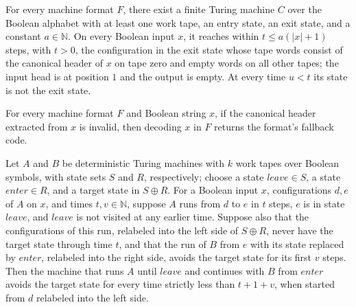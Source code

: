 \begin{lemma}
\label{Turing.MachineFormat.exists_canonHeaderBranch}
\leanok
{}
For every machine format $F$, there exist a finite Turing machine $C$ over the Boolean
alphabet with at least one work tape, an entry state, an exit state, and a constant
$a\in\mathbb N$. On every Boolean input $x$, it reaches within $t\le a(|x|+1)$ steps,
with $t>0$, the configuration in the exit state whose tape words consist of the
canonical header of $x$ on tape zero and empty words on all other tapes; the input head
is at position $1$ and the output is empty. At every time $u<t$ its state is not the
exit state.
\end{lemma}

\begin{lemma}
\label{Turing.MachineFormat.decode_of_canonHeader}
\leanok
{}
For every machine format $F$ and Boolean string $x$, if the canonical header extracted
from $x$ is invalid, then decoding $x$ in $F$ returns the format’s fallback code.
\end{lemma}

\begin{lemma}
\label{Turing.MachineFormat.canonSeam_avoids}
\leanok
{}
Let $A$ and $B$ be deterministic Turing machines with $k$ work tapes over Boolean
symbols, with state sets $S$ and $R$, respectively; choose a state $leave\in S$, a state
$enter\in R$, and a target state in $S\oplus R$. For a Boolean input $x$, configurations
$d,e$ of $A$ on $x$, and times $t,v\in\mathbb N$, suppose $A$ runs from $d$ to $e$ in
$t$ steps, $e$ is in state $leave$, and $leave$ is not visited at any earlier time.
Suppose also that the configurations of this run, relabeled into the left side of
$S\oplus R$, never have the target state through time $t$, and that the run of $B$ from
$e$ with its state replaced by $enter$, relabeled into the right side, avoids the target
state for its first $v$ steps. Then the machine that runs $A$ until $leave$ and
continues with $B$ from $enter$ avoids the target state for every time strictly less
than $t+1+v$, when started from $d$ relabeled into the left side.
\end{lemma}

